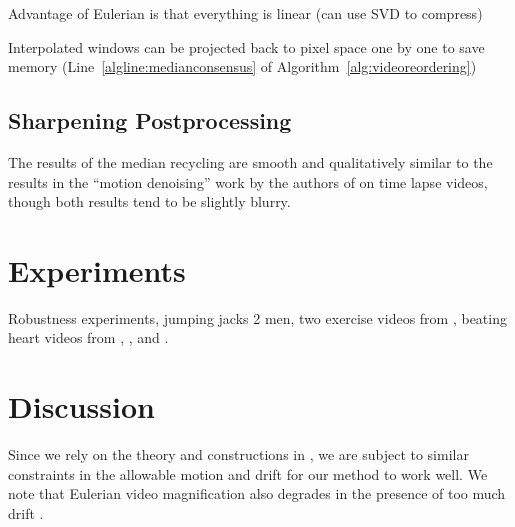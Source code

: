 \documentclass{article}
\begin{document}
Advantage of Eulerian is that everything is linear (can use SVD to compress)

Interpolated windows can be projected back to pixel space one by one to save memory (Line~\ref{algline:medianconsensus} of Algorithm~\ref{alg:videoreordering})

\subsection{Sharpening Postprocessing}

The results of the median recycling are smooth and qualitatively similar to the results in the ``motion denoising'' work by the authors of \cite{rubinstein2011motion} on time lapse videos, though both results tend to be slightly blurry.


\section{Experiments}

Robustness experiments, jumping jacks 2 men, two exercise videos from \cite{levy2015live}, beating heart videos from \cite{traliehigh}, \cite{wu2012eulerian}, and \cite{wadhwa2013phase}.


\section{Discussion}

Since we rely on the theory and constructions in \cite{tralie2017quasi}, we are subject to similar constraints in the allowable motion and drift for our method to work well.  We note that Eulerian video magnification also degrades in the presence of too much drift \cite{wu2012eulerian, wadhwa2013phase}.




\end{document}
